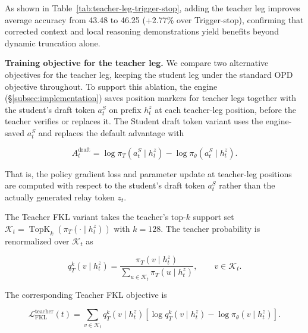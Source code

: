 \documentclass{article} %
\begin{document}
As shown in Table~\ref{tab:teacher-leg-trigger-stop}, adding the teacher leg improves average accuracy from 43.48 to 46.25 (+2.77\% over Trigger-stop), confirming that corrected context and local reasoning demonstrations yield benefits beyond dynamic truncation alone.\par



\textbf{Training objective for the teacher leg.} We compare two alternative objectives for the teacher leg, keeping the student leg under the standard OPD objective throughout. To support this ablation, the engine (\S\ref{subsec:implementation}) saves position markers for teacher legs together with the student's draft token $a_t^S$ on prefix $h_t^z$ at each teacher-leg position, before the teacher verifies or replaces it. The Student draft token variant uses the engine-saved $a_t^S$ and replaces the default advantage with\par

\begin{equation}
A_t^{\mathrm{draft}}
=
\log\pi_T(a_t^S\mid h_t^z)
-\log\pi_{\bar\theta}(a_t^S\mid h_t^z).
\end{equation}

That is, the policy gradient loss and parameter update at teacher-leg positions are computed with respect to the student's draft token $a_t^S$ rather than the actually generated relay token $z_t$.\par

The Teacher FKL variant takes the teacher's top-$k$ support set $\mathcal K_t=\operatorname{TopK}_k\!\left(\pi_T(\cdot\mid h_t^z)\right)$ with $k=128$. The teacher probability is renormalized over $\mathcal K_t$ as\par

\begin{equation}
q_T^k(v\mid h_t^z)
=
\frac{\pi_T(v\mid h_t^z)}
{\sum_{u\in\mathcal K_t}\pi_T(u\mid h_t^z)},
\qquad v\in\mathcal K_t.
\end{equation}

The corresponding Teacher FKL objective is\par

\begin{equation}
\mathcal L_{\mathrm{FKL}}^{\mathrm{teacher}}(t)
=
\sum_{v\in\mathcal K_t}
q_T^k(v\mid h_t^z)
\left[
\log q_T^k(v\mid h_t^z)
-\log\pi_\theta(v\mid h_t^z)
\right].
\end{equation}
\end{document}
